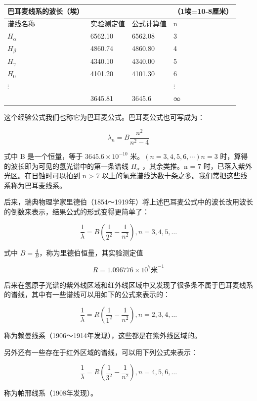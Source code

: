 {\def\LTcaptype{none} %
\begin{longtable}[]{@{}llll@{}}
\toprule\noalign{}
巴耳麦线系的波长（埃） & & & （1埃=10-8厘米） \\
\midrule\noalign{}
\endhead
\bottomrule\noalign{}
\endlastfoot
谱线名称 & 实验测定值 & 公式计算值 & n \\
\(H_{\alpha}\) & 6562.10 & 6562.08 & 3 \\
\(H_{\beta}\) & 4860.74 & 4860.80 & 4 \\
\(H_{\gamma}\) & 4340.10 & 4340.00 & 5 \\
\(H_{0}\) & 4101.20 & 4101.30 & 6 \\
\(\vdots\) & & & \(\vdots\) \\
& 3645.81 & 3645.6 & ∞ \\
\end{longtable}
}

这个经验公式我们也称它为巴耳麦公式。巴耳麦公式也可写成为：

\[
\lambda_ {n} = B \frac {n ^ {2}}{n ^ {2} - 4}
\]

式中 B 是一个恒量，等于 \(3645.6 \times 10^{-10}\)
米。\((n = 3, 4, 5, 6, \cdots) n = 3\)
时，算得的波长即为可见的氢光谱中的第一条谱线 \(H_{\alpha}\)
，其余类推。n = 7 时，已落入紫外光区。在日蚀时可以拍到 n \textgreater{}
7 以上的氢光谱线达数十条之多。我们常把这些线系称为巴耳麦线系。

后来，瑞典物理学家里德伯（1854～1919年）将上述巴耳麦公式中的波长改用波长的倒数来表示，结果公式的形式变得更简单了：

\[
\frac {1}{\lambda} = B \left(\frac {1}{2 ^ {2}} - \frac {1}{n ^ {2}}\right), n = 3, 4, 5, \dots
\]

式中 \(B = \frac{4}{B}\)，称为里德伯恒量，其实验测定值

\[
R = 1.096776 \times 10 ^ {7} \text{米} ^ {- 1}
\]

后来在氢原子光谱的紫外线区域和红外线区域中又发现了很多条不属于巴耳麦线系的谱线，其中有一些谱线可以用如下的公式来表示的：

\[
\frac {1}{\lambda} = R \left(\frac {1}{1 ^ {2}} - \frac {1}{n ^ {2}}\right), n = 2, 3, 4, \dots
\]

称为赖曼线系（1906～1914年发现），这些都是在紫外线区域的。

另外还有一些存在于红外区域的谱线，可以用下列公式来表示：

\[
\frac {1}{\lambda} = R \left(\frac {1}{3 ^ {2}} - \frac {1}{n ^ {2}}\right), n = 4, 5, 6, \dots
\]

称为帕邢线系（1908年发现）。

